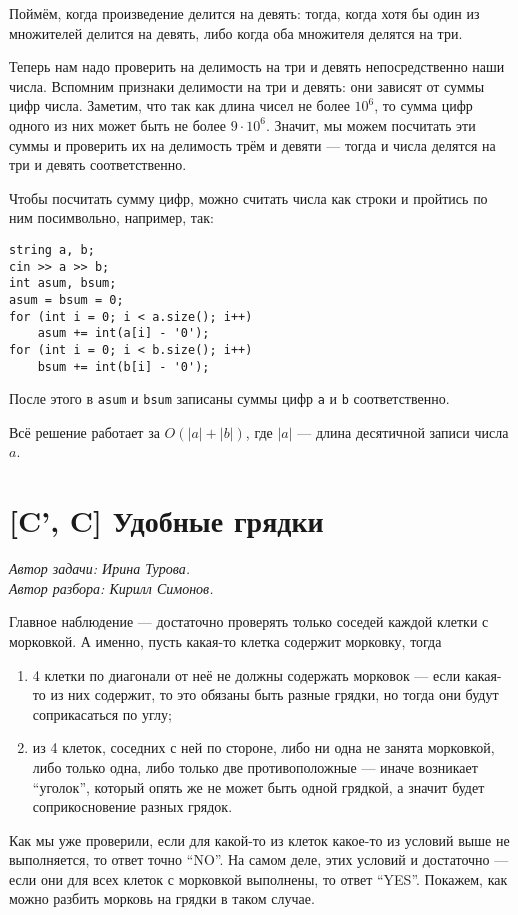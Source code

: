\documentclass[12pt]{article}
\theoremstyle{definition}
\begin{document}
Поймём, когда произведение делится на девять: тогда, когда хотя бы один из множителей делится на девять, либо когда оба множителя делятся на три.

Теперь нам надо проверить на делимость на три и девять непосредственно наши числа. Вспомним признаки делимости на три и девять: они зависят от суммы цифр числа. Заметим, что так как длина чисел не более $10^6$, то сумма цифр одного из них может быть не более $9 \cdot 10^6$. Значит, мы можем посчитать эти суммы и проверить их на делимость трём и девяти --- тогда и числа делятся на три и девять соответственно.

Чтобы посчитать сумму цифр, можно считать числа как строки и пройтись по ним посимвольно, например, так:
\begin{verbatim}
string a, b;
cin >> a >> b;
int asum, bsum;
asum = bsum = 0;
for (int i = 0; i < a.size(); i++)
    asum += int(a[i] - '0');
for (int i = 0; i < b.size(); i++)
    bsum += int(b[i] - '0');
\end{verbatim}
После этого в \verb|asum| и \verb|bsum| записаны суммы цифр \verb|a| и \verb|b| соответственно.

Всё решение работает за $O(|a| + |b|)$, где $|a|$ --- длина десятичной записи числа $a$.

\pagebreak

\section{[C', C] Удобные грядки}
\textit{Автор задачи: Ирина Турова.} \\
\textit{Автор разбора: Кирилл Симонов.}

Главное наблюдение --- достаточно проверять только соседей каждой клетки с морковкой. А именно, пусть какая-то клетка содержит морковку, тогда
\begin{enumerate}
    \item 4 клетки по диагонали от неё не должны содержать морковок --- если какая-то из них содержит, то это обязаны быть разные грядки, но тогда они будут соприкасаться по углу;
    \item из 4 клеток, соседних с ней по стороне, либо ни одна не занята морковкой, либо только одна, либо только две противоположные --- иначе возникает ``уголок'', который опять же
        не может быть одной грядкой, а значит будет соприкосновение разных грядок.
\end{enumerate}

Как мы уже проверили, если для какой-то из клеток какое-то из условий выше не выполняется, то ответ точно ``NO''. На самом деле, этих условий и достаточно --- если они для всех клеток
с морковкой
выполнены, то ответ ``YES''. Покажем, как можно разбить морковь на грядки в таком случае.
\end{document}
